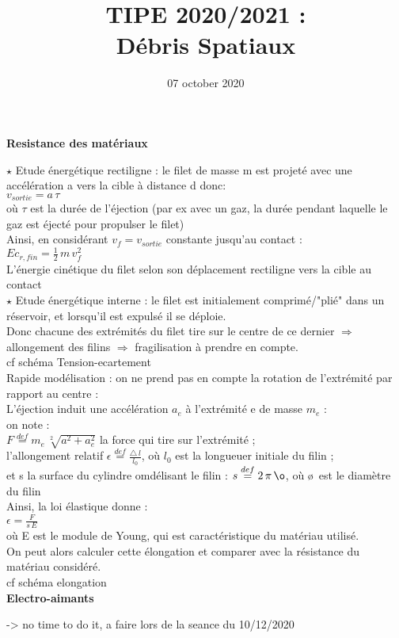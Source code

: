 \documentclass[a4paper,1pt]{article}
\title{TIPE 2020/2021 : \\ Débris Spatiaux}
\date{07 october 2020}
\begin{document}
\maketitle
\textbf{Resistance des matériaux}

$\star$ Etude énergétique rectiligne : le filet de masse m est projeté avec une accélération a vers la cible à 
distance d donc:\\

$ v_{sortie} = a\,\tau $\\

où $\tau$ est la durée de l'éjection (par ex avec un gaz, la durée pendant laquelle le gaz est éjecté pour propulser le filet)\\
Ainsi, en considérant $v_f = v_{sortie}$ constante jusqu'au contact :\\

$ Ec_{r,fin} = \frac{1}{2}\,m\,v_f^2 $\\

L'énergie cinétique du filet selon son déplacement rectiligne vers la cible au contact\\

$\star$ Etude énergétique interne : le filet est initialement comprimé/"plié" dans un réservoir, et lorsqu'il est expulsé il se déploie.\\
Donc chacune des extrémités du filet tire sur le centre de ce dernier $\Rightarrow$ allongement des filins $\Rightarrow$ fragilisation à prendre en compte.\\
cf schéma Tension-ecartement\\

Rapide modélisation : on ne prend pas en compte la rotation de l'extrémité par rapport au centre :\\
L'éjection induit une accélération $a_e$ à l'extrémité e de masse $m_e$ :\\
on note :\\
$F \stackrel{def}{=} m_e \, \sqrt[2]{a^2 + a_e^2}$ la force qui tire sur l'extrémité ;\\
l'allongement relatif $\epsilon \stackrel{def}{=} \frac{\triangle\,l}{l_0}$, où $l_0$ est la longueuer initiale du filin ;\\
et s la surface du cylindre omdélisant le filin : $s \stackrel{def}{=} 2\,\pi\,\o$,
où \o\, est le diamètre du filin\\

Ainsi, la loi élastique donne :\\

$\epsilon = \frac{F}{s\,E}$\\

où E est le module de Young, qui est caractéristique du matériau utilisé.\\

On peut alors calculer cette élongation et comparer avec la résistance du matériau considéré.\\
cf schéma elongation\\

\textbf{Electro-aimants}

-> no time to do it, a faire lors de la seance du 10/12/2020
\end{document}
